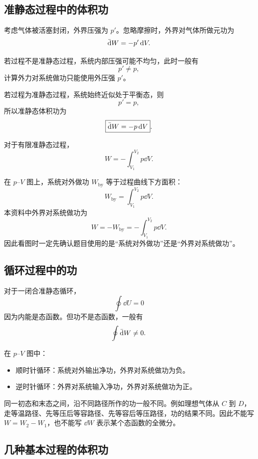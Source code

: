 \subsection{准静态过程中的体积功}

考虑气体被活塞封闭，外界压强为 \(p'\)。忽略摩擦时，外界对气体所做元功为
\[
  \mathop{}\!\bar{\mathrm{d}} W=-p'\mathop{}\!\mathrm{d} V.
\]

若过程不是准静态过程，系统内部压强可能不均匀，此时一般有
\[
  p'\ne p,
\]
计算外力对系统做功只能使用外压强 \(p'\)。

若过程为准静态过程，系统始终近似处于平衡态，则
\[
  p'=p,
\]
所以准静态体积功为
\[
  \boxed{\mathop{}\!\bar{\mathrm{d}} W=-p\mathop{}\!\mathrm{d} V}.
\]

对于有限准静态过程，
\[
  \boxed{
  W=-\int_{V_1}^{V_2}p\dd V
  }.
\]

\begin{KeyBox}[\(p\)--\(V\) 图中的功]
在 \(p\)--\(V\) 图上，系统对外做功 \(W_{\mathrm{by}}\) 等于过程曲线下方面积：
\[
  W_{\mathrm{by}}=\int_{V_1}^{V_2}p\dd V.
\]
本资料中外界对系统做功为
\[
  W=-W_{\mathrm{by}}=-\int_{V_1}^{V_2}p\dd V.
\]
因此看图时一定先确认题目使用的是“系统对外做功”还是“外界对系统做功”。
\end{KeyBox}

\subsection{循环过程中的功}

对于一闭合准静态循环，
\[
  \oint \dd U=0
\]
因为内能是态函数。但功不是态函数，一般有
\[
  \oint \mathop{}\!\bar{\mathrm{d}} W\ne 0.
\]

在 \(p\)--\(V\) 图中：
\begin{itemize}
  \item 顺时针循环：系统对外输出净功，外界对系统做功为负。
  \item 逆时针循环：外界对系统输入净功，外界对系统做功为正。
\end{itemize}

\begin{WarnBox}
同一初态和末态之间，沿不同路径所作的功一般不同。例如理想气体从 \(C\) 到 \(D\)，走等温路径、先等压后等容路径、先等容后等压路径，功的结果不同。因此不能写 \(W=W_2-W_1\)，也不能写 \(\dd W\) 表示某个态函数的全微分。
\end{WarnBox}

\subsection{几种基本过程的体积功}

